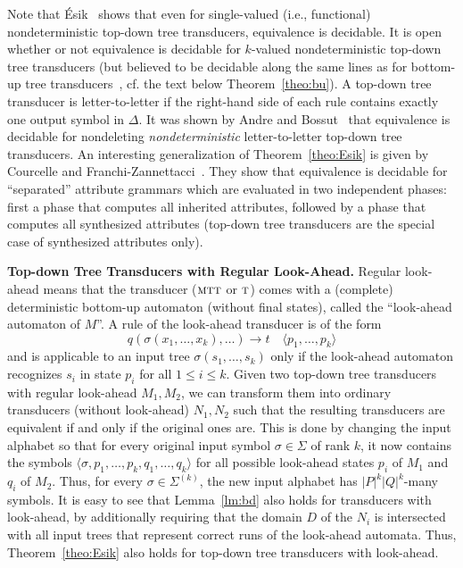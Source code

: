 \documentclass[copyright,creativecommons]{eptcs}
\newcommand{\ttt}{\textsc{t}}
\newcommand{\mtt}{\textsc{mtt}}
\begin{document}
Note that {\'E}sik~\cite{DBLP:journals/actaC/Esik81} shows that
even for single-valued (i.e., functional) nondeterministic top-down
tree transducers, equivalence is decidable. 
It is open whether or not equivalence is decidable for
$k$-valued nondeterministic top-down tree transducers
(but believed to be decidable along the same lines as for bottom-up
tree transducers~\cite{sei2014}, cf. the text below Theorem~\ref{theo:bu}).
A top-down tree transducer is letter-to-letter if the right-hand
side of each rule contains exactly one output symbol in $\Delta$.
It was shown by Andre and Bossut~\cite{DBLP:journals/tcs/AndreB98}
that equivalence is decidable for nondeleting \emph{nondeterministic} letter-to-letter
top-down tree transducers.
An interesting generalization of Theorem~\ref{theo:Esik} is given
by Courcelle and Franchi-Zannettacci~\cite{DBLP:journals/iandc/CourcelleF82}.
They show that equivalence is decidable for ``separated'' attribute grammars which are 
evaluated in two
independent phases: first a phase that computes all inherited
attributes, followed by a phase that computes all synthesized attributes
(top-down tree transducers are the special case of synthesized
attributes only).

\bigskip

{\bf Top-down Tree Transducers with Regular Look-Ahead.}\quad
Regular look-ahead means that the transducer ($\mtt$ or $\ttt$) comes with
a (complete) deterministic bottom-up automaton (without final
states), called the ``look-ahead
automaton of $M$''. A rule of the look-ahead transducer is of the form
\[
q(\sigma(x_1,\dots,x_k),\dots)\to t\quad\langle p_1,\dots,p_k\rangle
\]
and is applicable to an input tree $\sigma(s_1,\dots,s_k)$ only if 
the look-ahead automaton recognizes $s_i$ in state $p_i$ for all $1\leq i\leq k$.   
Given two top-down tree
transducers with regular look-ahead $M_1, M_2$, we can transform them into
ordinary transducers (without look-ahead) $N_1, N_2$ such that the resulting
transducers are equivalent if and only if the original ones are.
This is done by changing the input alphabet so that 
for every original input symbol $\sigma\in\Sigma$ of rank $k$, 
it now contains the symbols 
$\langle\sigma, p_1,\dots, p_k, q_1,\dots, q_k\rangle$
for all possible look-ahead states $p_i$ of $M_1$ and $q_i$ of $M_2$.
Thus, for every $\sigma\in\Sigma^{(k)}$, the 
new input alphabet has $|P|^k|Q|^k$-many symbols.
It is easy to see that Lemma~\ref{lm:bd} also holds 
for transducers with look-ahead, by additionally requiring
that the domain $D$ of the $N_i$ is intersected with all input trees that represent
correct runs of the look-ahead automata. 
Thus, Theorem~\ref{theo:Esik} also holds for top-down tree transducers with look-ahead. 
\end{document}
